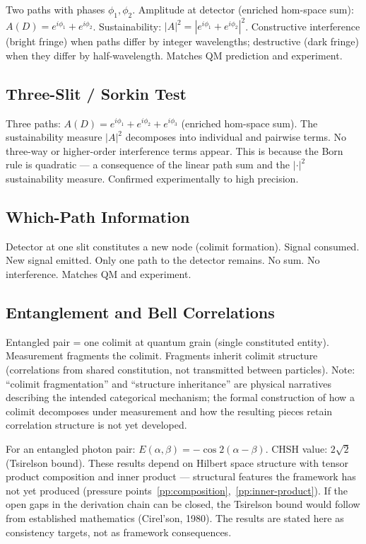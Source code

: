 \documentclass[12pt,a4paper]{article}
\begin{document}
Two paths with phases $\phi_1, \phi_2$. Amplitude at detector (enriched hom-space sum): $A(D) = e^{i\phi_1} + e^{i\phi_2}$. Sustainability: $|A|^2 = |e^{i\phi_1} + e^{i\phi_2}|^2$. Constructive interference (bright fringe) when paths differ by integer wavelengths; destructive (dark fringe) when they differ by half-wavelength. Matches QM prediction and experiment.

\subsection{Three-Slit / Sorkin Test}
\label{sec:three-slit}

Three paths: $A(D) = e^{i\phi_1} + e^{i\phi_2} + e^{i\phi_3}$ (enriched hom-space sum). The sustainability measure $|A|^2$ decomposes into individual and pairwise terms. No three-way or higher-order interference terms appear. This is because the Born rule is quadratic --- a consequence of the linear path sum and the $|\cdot|^2$ sustainability measure. Confirmed experimentally to high precision.

\subsection{Which-Path Information}
\label{sec:which-path}

Detector at one slit constitutes a new node (colimit formation). Signal consumed. New signal emitted. Only one path to the detector remains. No sum. No interference. Matches QM and experiment.

\subsection{Entanglement and Bell Correlations}
\label{sec:entanglement}

Entangled pair = one colimit at quantum grain (single constituted entity). Measurement fragments the colimit. Fragments inherit colimit structure (correlations from shared constitution, not transmitted between particles). Note: ``colimit fragmentation'' and ``structure inheritance'' are physical narratives describing the intended categorical mechanism; the formal construction of how a colimit decomposes under measurement and how the resulting pieces retain correlation structure is not yet developed.

For an entangled photon pair: $E(\alpha, \beta) = -\cos 2(\alpha - \beta)$. CHSH value: $2\sqrt{2}$ (Tsirelson bound). These results depend on Hilbert space structure with tensor product composition and inner product --- structural features the framework has not yet produced (pressure points~\ref{pp:composition},~\ref{pp:inner-product}). If the open gaps in the derivation chain can be closed, the Tsirelson bound would follow from established mathematics (Cirel'son, 1980). The results are stated here as consistency targets, not as framework consequences.
\end{document}
